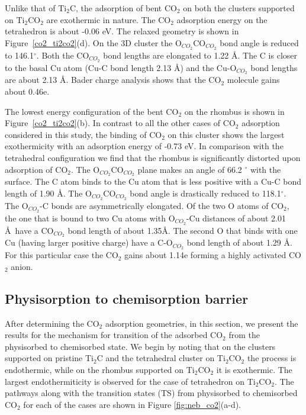 Unlike that of Ti$_2$C, the adsorption of bent CO$_2$ on both the clusters supported on Ti$_2$CO$_2$ are exothermic in nature. The CO$_2$ adsorption energy on the tetrahedron
is about -0.06 eV. The relaxed geometry is shown in Figure~\ref{co2_ti2co2}(d). On the 3D cluster the O$_{CO_2}$CO$_{CO_2}$ bond angle is reduced to 146.1$^{\circ}$.
Both the CO$_{CO_2}$ bond lengths are elongated to 1.22 \AA. The C is closer to the basal Cu atom (Cu-C bond length 2.13 \AA) and the Cu-O$_{CO_2}$ bond lengths are about 2.13 \AA. Bader charge analysis shows that
the CO$_2$ molecule gains about 0.46e. 

The lowest energy configuration of the bent CO$_2$ on the rhombus is shown in Figure~\ref{co2_ti2co2}(b). In contrast to all the other cases of CO$_2$ adsorption considered
in this study, the binding of CO$_2$ on this cluster shows the largest exothermicity with an
adsorption energy of -0.73 eV. In comparison with the tetrahedral configuration we find that the 
rhombus is significantly distorted upon adsorption of CO$_2$. The O$_{CO_2}$CO$_{CO_2}$ plane makes an angle of 66.2 $^{\circ}$ with the surface. The C atom binds to the Cu atom that is less positive with a Cu-C bond length of 1.90 \AA. The 
O$_{CO_2}$CO$_{CO_2}$ bond angle is drastically reduced to 118.1$^{\circ}$. The  O$_{CO_2}$-C bonds are asymmetrically elongated. Of the two O atoms of CO$_2$, the one that is bound to two Cu atoms with O$_{CO_2}$-Cu distances of about 2.01 \AA~have a 
CO$_{CO_2}$ bond length of about 1.35\AA. The second O that binds with one Cu (having 
larger positive charge) have a C-O$_{CO_2}$ bond length of about 1.29 \AA. For this 
particular case the CO$_2$ gains about 1.14e forming a highly activated CO$_2$ anion.

\subsection{Physisorption to chemisorption barrier}

After determining the CO$_2$ adsorption geometries, in this section, we present the results for
the mechanism for transition of the adsorbed CO$_2$ from the physisorbed to chemisorbed state.
We begin by noting that on the clusters supported on pristine Ti$_2$C and the tetrahedral
cluster on Ti$_2$CO$_2$ the process is endothermic, while on the rhombus supported on
Ti$_2$CO$_2$ it is exothermic. The largest endothermiticity is observed for the case of tetrahedron
on Ti$_2$CO$_2$. The pathways along with the transition states (TS) from physisorbed to chemisorbed 
CO$_2$ for each of the cases are shown in Figure \ref{fig:neb_co2}(a-d).

